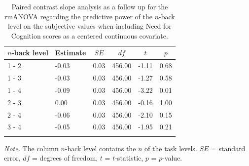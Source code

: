 \documentclass[
  man,floatsintext]{apa6}
\begin{document}
\begin{table}[H]

\begin{center}
\begin{threeparttable}

\caption{\label{tab:unnamed-chunk-19}Paired contrast slope analysis as a follow up for the rmANOVA regarding the predictive power of the $n$-back level on the subjective values when including Need for Cognition scores as a centered continuous covariate.}

\begin{tabular}{llllll}
\toprule
$n$-back level & \multicolumn{1}{c}{Estimate} & \multicolumn{1}{c}{$SE$} & \multicolumn{1}{c}{$df$} & \multicolumn{1}{c}{$t$} & \multicolumn{1}{c}{$p$}\\
\midrule
1 - 2 & -0.03 & 0.03 & 456.00 & -1.11 & 0.68\\
1 - 3 & -0.03 & 0.03 & 456.00 & -1.27 & 0.58\\
1 - 4 & -0.09 & 0.03 & 456.00 & -3.22 & 0.01\\
2 - 3 & 0.00 & 0.03 & 456.00 & -0.16 & 1.00\\
2 - 4 & -0.06 & 0.03 & 456.00 & -2.10 & 0.15\\
3 - 4 & -0.05 & 0.03 & 456.00 & -1.95 & 0.21\\
\bottomrule
\addlinespace
\end{tabular}

\begin{tablenotes}[para]
\normalsize{\textit{Note.} The column $n$-back level contains the $n$ of the task levels. $SE$ = standard error, $df$ = degrees of freedom, $t$ = $t$-statistic, $p$ = $p$-value.}
\end{tablenotes}

\end{threeparttable}
\end{center}

\end{table}

\newpage
\end{document}

